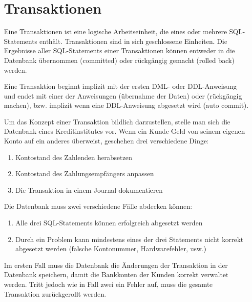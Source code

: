   \chapter{Transaktionen}
    \setcounter{page}{1}
    \minitoc
\newpage
      Eine Transaktionen ist eine logische Arbeitseinheit, die eines oder mehrere SQL-State\-ments enth\"alt. Transaktionen sind in sich geschlossene Einheiten. Die Ergebnisse aller SQL-Statements einer Transaktionen k\"onnen entweder in die Datenbank \"ubernommen (committed) oder r\"uckg\"angig gemacht (rolled back) werden.

      Eine Transaktion beginnt implizit mit der ersten DML- oder DDL-Anweisung  und endet mit einer der Anweisungen  (\"ubernahme der Daten) oder  (r\"uckg\"angig machen), bzw. implizit wenn eine DDL-Anweisung abgesetzt wird (auto commit).

      Um das Konzept einer Transaktion bildlich darzustellen, stelle man sich die Datenbank eines Kreditinstitutes vor. Wenn ein Kunde Geld von seinem eigenen Konto auf ein anderes \"uberweist, geschehen drei verschiedene Dinge:
      \begin{enumerate}
        \item Kontostand des Zahlenden herabsetzen
        \item Kontostand des Zahlungsempf\"angers anpassen
        \item Die Transaktion in einem Journal dokumentieren
      \end{enumerate}
      Die Datenbank muss zwei verschiedene F\"alle abdecken k\"onnen:
      \begin{enumerate}
        \item Alle drei SQL-Statements k\"onnen erfolgreich abgesetzt werden
        \item Durch ein Problem kann mindestens eines der drei Statements nicht korrekt abgesetzt werden (falsche Kontonummer, Hardwarefehler, usw.)
      \end{enumerate}
      Im ersten Fall muss die Datenbank die \"Anderungen der Transaktion in der Datenbank speichern, damit die Bankkonten der Kunden korrekt verwaltet werden. Tritt jedoch wie in Fall zwei ein Fehler auf, muss die gesamte Transaktion zur\"uckgerollt werden.
